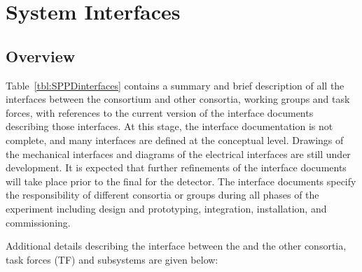 \section{System Interfaces}
\label{sec:fdsp-pd-intfc}


\subsection{Overview}
Table~\ref{tbl:SPPDinterfaces} contains a summary and brief description of all the interfaces between the   consortium and other consortia, working groups and task forces, with references to the current version of the interface documents describing those interfaces.  At this stage, the interface documentation is not complete, and many interfaces are defined at the conceptual level. Drawings of the mechanical interfaces and diagrams of the electrical interfaces are still under development. It is expected that further refinements of the interface documents will take place prior to the final  for the detector. The interface documents specify the responsibility of different consortia or groups during all phases of the experiment including design and prototyping, integration,  installation, and  commissioning.



Additional details describing the interface between the   and the other consortia, task forces (TF) and subsystems are given below:

